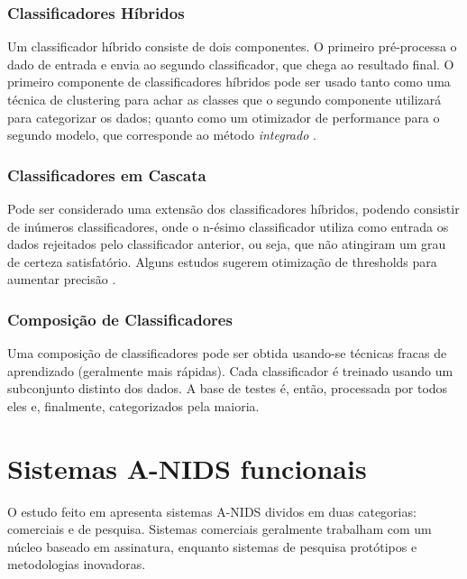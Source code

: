  \subsection{Classificadores Híbridos}
    Um classificador híbrido consiste de dois componentes. O primeiro pré-processa o dado de entrada e envia ao segundo
    classificador, que chega ao resultado final. O primeiro componente de classificadores híbridos pode ser usado tanto
    como uma técnica de clustering para achar as classes que o segundo componente utilizará para categorizar os dados;
    quanto como um otimizador de performance para o segundo modelo, que corresponde ao método \textit{integrado}
    \cite{aydin09}.


 \subsection{Classificadores em Cascata}
    Pode ser considerado uma extensão dos classificadores híbridos, podendo consistir de inúmeros classificadores, onde
    o n-ésimo classificador utiliza como entrada os dados rejeitados pelo classificador anterior, ou seja, que não
    atingiram um grau de certeza satisfatório. Alguns estudos sugerem otimização de thresholds para aumentar precisão
    \cite{oliveira05}.

 \subsection{Composição de Classificadores}
    Uma composição de classificadores pode ser obtida usando-se técnicas fracas de aprendizado
    (geralmente mais rápidas). Cada classificador é treinado usando um subconjunto distinto dos dados.
    A base de testes é, então, processada por todos eles e, finalmente, categorizados pela maioria.


\chapter{Sistemas A-NIDS funcionais}
    O estudo feito em \cite{teodoro09} apresenta sistemas A-NIDS dividos em duas categorias: comerciais e de pesquisa.
    Sistemas comerciais geralmente trabalham com um núcleo baseado em assinatura, enquanto sistemas de pesquisa
    protótipos e metodologias inovadoras.

